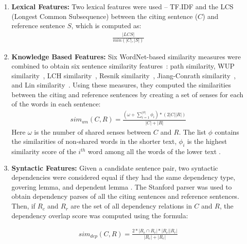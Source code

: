 \documentclass[11pt]{article}
\begin{document}

\begin{enumerate}
\item{\bf Lexical Features:} Two lexical features were used -- TF.IDF and the LCS (Longest Common Subsequence) between the citing sentence ($C$) and reference sentence $S$, which is computed as:
\vspace{-.3cm}
\begin{eqnarray*}
  \frac{|LCS|}{min(|C|,|S|)}
\end{eqnarray*}
\item{\bf Knowledge Based Features:} Six WordNet-based similarity measures were combined to obtain six sentence similarity features~\cite{Banea2012}: path similarity, WUP similarity~\cite{Wu:1994:VSL:981732.981751}, LCH similarity~\cite{leacock1998combining}, Resnik similarity~\cite{Resnik:1995:UIC:1625855.1625914}, Jiang-Conrath similarity~\cite{Jiang97taxonomySimilarity}, and Lin similarity~\cite{Lin:1998:IDS:645527.657297}. 
Using these measures, they computed the similarities between the citing and reference sentences by creating a set of senses for each of the words in each sentence:
\vspace{-.3cm}
\begin{eqnarray*}
  sim_{wn}(C,R) = \frac{(\omega + \sum_{i=1}^{|\phi|}\phi_i) * (2|C||R|)}{|C|+|R|}
\end{eqnarray*}
Here $\omega$ is the number of shared senses between $C$ and $R$. The list $\phi$ contains the similarities of non-shared words in the shorter text, $\phi_i$ is the highest similarity score of the $i^{th}$ word among all the words of the lower text \cite{S13-1017}. 
\item{\bf Syntactic Features:} Given a candidate sentence pair, two syntactic dependencies were considered equal if they had the same dependency type, govering lemma, and dependent lemma \cite{S13-1017}. The Stanford parser was used to obtain dependency parses of all the citing sentences and reference sentences. Then, if $R_c$ and $R_r$ are the set of all dependency relations in $C$ and $R$, the dependency overlap score was computed using the formula:

\vspace{-.3cm}
\begin{eqnarray*}
  sim_{dep}(C,R) = \frac{2*|R_c \cap R_r| * |R_c||R_r|}{|R_c|+|R_r|}
\end{eqnarray*}
\end{enumerate}
 
\end{document}
